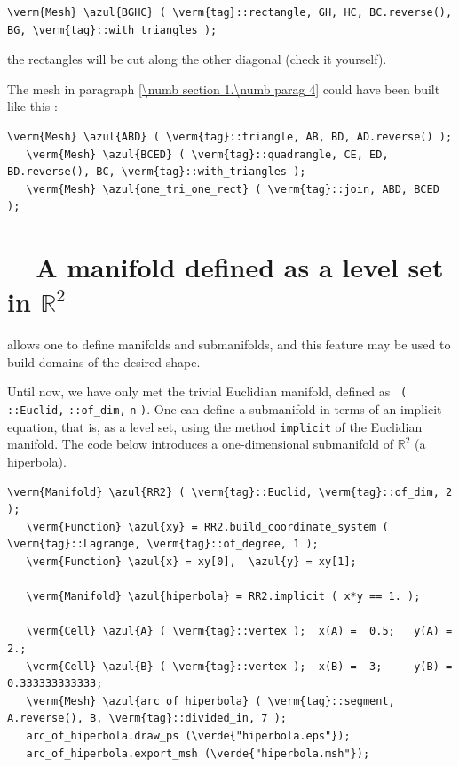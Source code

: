 \begin{Verbatim}[commandchars=\\\{\},formatcom=\small\tt,baselinestretch=0.94]
   \verm{Mesh} \azul{BGHC} ( \verm{tag}::rectangle, GH, HC, BC.reverse(), BG, \verm{tag}::with_triangles );
\end{Verbatim}

\noindent the rectangles will be cut along the other diagonal (check it yourself).

The mesh in paragraph \ref{\numb section 1.\numb parag 4} could have been built like this :

\begin{Verbatim}[commandchars=\\\{\},formatcom=\small\tt,baselinestretch=0.94]
   \verm{Mesh} \azul{ABD} ( \verm{tag}::triangle, AB, BD, AD.reverse() );
   \verm{Mesh} \azul{BCED} ( \verm{tag}::quadrangle, CE, ED, BD.reverse(), BC, \verm{tag}::with_triangles );
   \verm{Mesh} \azul{one_tri_one_rect} ( \verm{tag}::join, ABD, BCED );
\end{Verbatim}


\section{~~A manifold defined as a level set in $ \mathbb{R}^2 $}
\label{\numb section 2.\numb parag 3}

{\ManiFEM} allows one to define manifolds and submanifolds, and this feature may be
used to build domains of the desired shape.

Until now, we have only met the trivial Euclidian manifold, defined as {\small\tt
{}\break ( ::Euclid,} {\small\tt {}::of\_dim,} {\small\tt n}
{\small\tt )}.
One can define a submanifold in terms of an implicit equation, that is, as a level set,
using the method {\small\tt implicit} of the Euclidian manifold.
The code below introduces a one-dimensional submanifold of $ \mathbb{R}^2 $ (a hiperbola).

\begin{Verbatim}[commandchars=\\\{\},formatcom=\small\tt,frame=single,
   label=main-\ref{\numb section 2.\numb parag 3}.cpp,rulecolor=\color{coment},
   baselinestretch=0.94,framesep=2mm]
   \verm{Manifold} \azul{RR2} ( \verm{tag}::Euclid, \verm{tag}::of_dim, 2 );
   \verm{Function} \azul{xy} = RR2.build_coordinate_system ( \verm{tag}::Lagrange, \verm{tag}::of_degree, 1 );
   \verm{Function} \azul{x} = xy[0],  \azul{y} = xy[1];
   
   \verm{Manifold} \azul{hiperbola} = RR2.implicit ( x*y == 1. );
   
   \verm{Cell} \azul{A} ( \verm{tag}::vertex );  x(A) =  0.5;   y(A) =  2.;
   \verm{Cell} \azul{B} ( \verm{tag}::vertex );  x(B) =  3;     y(B) =  0.333333333333;
   \verm{Mesh} \azul{arc_of_hiperbola} ( \verm{tag}::segment, A.reverse(), B, \verm{tag}::divided_in, 7 );
   arc_of_hiperbola.draw_ps (\verde{"hiperbola.eps"});
   arc_of_hiperbola.export_msh (\verde{"hiperbola.msh"});
\end{Verbatim}

